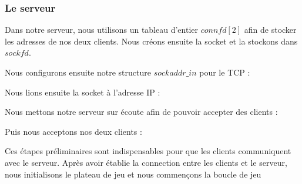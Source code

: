 \documentclass{article}
\begin{document}
    \subsubsection{Le serveur}
        Dans notre serveur, nous utilisons un tableau d'entier $connfd[2]$ afin de stocker les adresses de nos deux clients. Nous créons
        ensuite la socket et la stockons dans $sockfd$.

        \begin{changemargin}{-2cm}{-2cm}
            
        \end{changemargin}

        Nous configurons ensuite notre structure $sockaddr\_in$ pour le TCP :

        \begin{changemargin}{-2cm}{-2cm}
            
        \end{changemargin}

        Nous lions ensuite la socket à l'adresse IP :

        \begin{changemargin}{-2cm}{-2cm}
            
        \end{changemargin}
        
        Nous mettons notre serveur sur écoute afin de pouvoir accepter des clients :

        \begin{changemargin}{-2cm}{-2cm}
            
        \end{changemargin}

        Puis nous acceptons nos deux clients :

        \begin{changemargin}{-2cm}{-2cm}
            
        \end{changemargin}

        Ces étapes préliminaires sont indispensables pour que les clients communiquent avec le serveur.
        Après avoir établie la connection entre les clients et le serveur, nous initialisons le plateau de jeu et nous commençons 
        la boucle de jeu

        \begin{changemargin}{-2cm}{-2cm}
            
        \end{changemargin}
\end{document}
